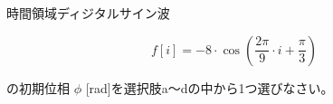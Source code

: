 時間領域ディジタルサイン波 

\[
f[i] = -8 \cdot \cos \left ( \frac{2 \pi}{9}  \cdot i + \frac{\pi}{3} \right )
\]

\noindent の初期位相 $\phi$ [rad]を選択肢a〜dの中から1つ選びなさい。
